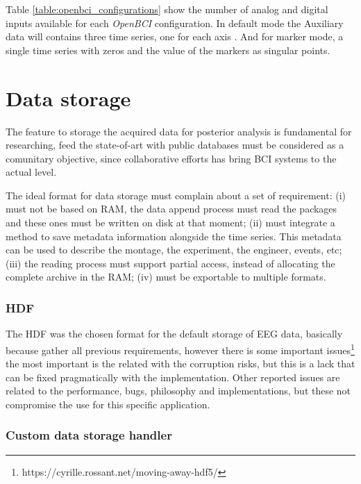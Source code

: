 Table \ref{table:openbci_configurations} show the number of analog and digital inputs available for each \textit{OpenBCI} configuration. In default mode the Auxiliary data will contains three time series, one for each axis . And for marker mode, a single time series with zeros and the value of the markers as singular points. 

\section{Data storage}

The feature to storage the acquired data for posterior analysis is fundamental for researching, feed the state-of-art with public databases must be considered as a comunitary objective, since collaborative efforts has bring \gls*{BCI} systems to the actual level.

The ideal format for data storage must complain about a set of requirement: 
(i) must not be based on RAM, the data append process must read the packages and these ones must be written on disk at that moment;
(ii) must integrate a method to save metadata information alongside the time series. This metadata can be used to describe the montage, the experiment, the engineer, events, etc;
(iii) the reading process must support partial access, instead of allocating the complete archive in the RAM;
(iv) must be exportable to multiple formats.

\subsubsection{\gls*{HDF}}

The \gls*{HDF} was the chosen format for the default storage of EEG data, basically because gather all previous requirements, however there is some important issues\footnote{https://cyrille.rossant.net/moving-away-hdf5/} the most important is the related with the corruption risks, but this is a lack that can be fixed pragmatically with the implementation. Other reported issues are related to the performance, bugs, philosophy and implementations, but these not compromise the use for this specific application.

\subsubsection{Custom data storage handler}

